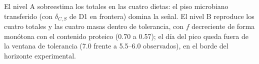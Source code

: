 El nivel A sobreestima los totales en las cuatro dietas: el piso microbiano transferido (con $\delta_{C,S}$ de D1 en frontera) domina la señal. El nivel B reproduce los cuatro totales y las cuatro masas dentro de tolerancia, con $f$ decreciente de forma monótona con el contenido proteico (0.70 a 0.57); el día del pico queda fuera de la ventana de tolerancia (7.0 frente a 5.5--6.0 observados), en el borde del horizonte experimental.
